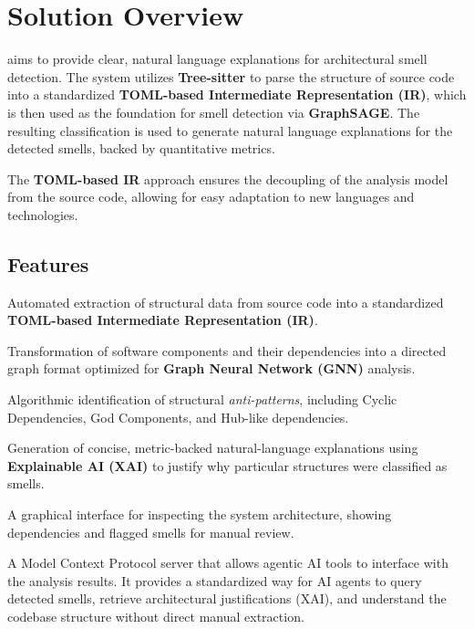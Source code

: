 \section{Solution Overview}
\label{section:solution-overview}

\textbf{\usevar{\srsNickName}} aims to provide clear, natural language explanations for architectural smell detection. The system utilizes \textbf{Tree-sitter} to parse the structure of source code into a standardized \textbf{TOML-based Intermediate Representation (IR)}, which is then used as the foundation for smell detection via \textbf{GraphSAGE}. The resulting classification is used to generate natural language explanations for the detected smells, backed by quantitative metrics.

The \textbf{TOML-based IR} approach ensures the decoupling of the analysis model from the source code, allowing for easy adaptation to new languages and technologies.



\subsection{Features}
\label{subsection:features}

\begin{description}[style=multiline, leftmargin=3.5cm, font=\normalfont]
    \item[\textbf{Multi-Language Parsing}] Automated extraction of structural data from source code into a standardized \textbf{TOML-based Intermediate Representation (IR)}.
    \item[\textbf{Graph-Based Modeling}] Transformation of software components and their dependencies into a directed graph format optimized for \textbf{Graph Neural Network (GNN)} analysis.
    \item[\textbf{Architectural Smell Detection}] Algorithmic identification of structural \textit{anti-patterns}, including Cyclic Dependencies, God Components, and Hub-like dependencies.
    \item[\textbf{XAI Explanations}] Generation of concise, metric-backed natural-language explanations using \textbf{Explainable AI (XAI)} to justify why particular structures were classified as smells.
    \item[\textbf{Visualization}] A graphical interface for inspecting the system architecture, showing dependencies and flagged smells for manual review.
    \item[\textbf{MCP Server}] A Model Context Protocol server that allows agentic AI tools to interface with the analysis results. It provides a standardized way for AI agents to query detected smells, retrieve architectural justifications (XAI), and understand the codebase structure without direct manual extraction.
\end{description}

